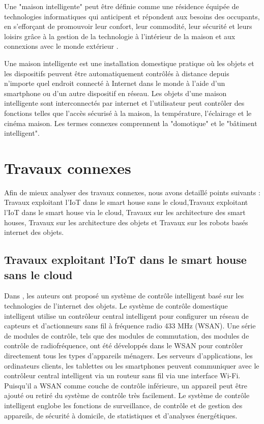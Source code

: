 Une "maison intelligente" peut être définie comme une résidence équipée de technologies informatiques qui anticipent et répondent aux besoins des occupants, en s'efforçant de promouvoir leur confort, leur commodité, leur sécurité et leurs loisirs grâce à la gestion de la technologie à l'intérieur de la maison et aux connexions avec le monde extérieur \cite{chap32}.


Une maison intelligente est une installation domestique pratique où les objets et les dispositifs peuvent être automatiquement contrôlés à distance depuis n'importe quel endroit connecté à Internet dans le monde à l'aide d'un smartphone ou d'un autre dispositif en réseau. Les objets d'une maison intelligente sont interconnectés par internet et l'utilisateur peut contrôler des fonctions telles que l'accès sécurisé à la maison, la température, l'éclairage et le cinéma maison. Les termes connexes comprennent la "domotique" et le "bâtiment intelligent". 

\section{Travaux connexes}

Afin de mieux analyser des travaux connexes, nous avons detaillé points suivants :
Travaux exploitant l’IoT dans le smart house sans  le cloud,Travaux exploitant l’IoT dans le smart house via le cloud, Travaux sur les architecture des smart houses, Travaux sur les architecture des objets et Travaux sur les robots basés internet des objets.

\subsection{Travaux exploitant l’IoT dans le smart house sans le cloud}
Dans \cite{chap37}, les auteurs ont proposé un système de contrôle intelligent basé sur les technologies de l'internet des objets. Le système de contrôle domestique intelligent utilise un contrôleur central intelligent pour configurer un réseau de capteurs et d'actionneurs sans fil à fréquence radio 433 MHz (WSAN). Une série de modules de contrôle, tels que des modules de commutation, des modules de contrôle de radiofréquence, ont été développés dans le WSAN pour contrôler directement tous les types d'appareils ménagers. Les serveurs d'applications, les ordinateurs clients, les tablettes ou les smartphones peuvent communiquer avec le contrôleur central intelligent via un routeur sans fil via une interface Wi-Fi. Puisqu'il a WSAN comme couche de contrôle inférieure, un appareil peut être ajouté ou retiré du système de contrôle très facilement. Le système de contrôle intelligent englobe les fonctions de surveillance, de contrôle et de gestion des appareils, de sécurité à domicile, de statistiques et d'analyses énergétiques.

